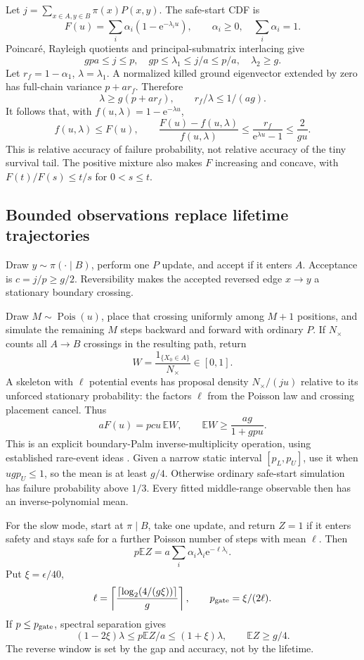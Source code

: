 \documentclass[11pt]{article}
\newcommand{\ee}{\mathrm e}
\begin{document}
Let \(j=\sum_{x\in A,y\in B}\pi(x)P(x,y)\). The safe-start CDF is
\[
 F(u)=\sum_i\alpha_i(1-\ee^{-\lambda_i u}),
 \qquad\alpha_i\ge0,\quad\sum_i\alpha_i=1.
\]
Poincar\'e, Rayleigh quotients and principal-submatrix interlacing give
\[
 gpa\le j\le p,\quad gp\le\lambda_1\le j/a\le p/a,
 \quad\lambda_2\ge g.
\]
Let \(r_f=1-\alpha_1\), \(\lambda=\lambda_1\). A normalized killed ground eigenvector extended by zero has full-chain variance \(p+ar_f\). Therefore
\[
 \lambda\ge g(p+ar_f),\qquad r_f/\lambda\le1/(ag).
\]
It follows that, with \(f(u,\lambda)=1-\ee^{-\lambda u}\),
\begin{equation}
 f(u,\lambda)\le F(u),\qquad
 \frac{F(u)-f(u,\lambda)}{f(u,\lambda)}
 \le\frac{r_f}{\ee^{\lambda u}-1}\le\frac2{gu}.
 \label{eq:tail}
\end{equation}
This is relative accuracy of failure probability, not relative accuracy of the tiny survival tail. The positive mixture also makes \(F\) increasing and concave, with \(F(t)/F(s)\le t/s\) for \(0<s\le t\).

\subsection{Bounded observations replace lifetime trajectories}
Draw \(y\sim\pi(\cdot\mid B)\), perform one \(P\) update, and accept if it enters \(A\). Acceptance is \(c=j/p\ge g/2\). Reversibility makes the accepted reversed edge \(x\to y\) a stationary boundary crossing.

Draw \(M\sim\operatorname{Pois}(u)\), place that crossing uniformly among \(M+1\) positions, and simulate the remaining \(M\) steps backward and forward with ordinary \(P\). If \(N_\times\) counts all \(A\to B\) crossings in the resulting path, return
\[
 W=\frac{1_{\{X_0\in A\}}}{N_\times}\in[0,1].
\]
A skeleton with \(\ell\) potential events has proposal density \(N_\times/(ju)\) relative to its unforced stationary probability: the factors \(\ell\) from the Poisson law and crossing placement cancel. Thus
\[
 aF(u)=pcu\,\mathbb EW,\qquad
 \mathbb EW\ge\frac{ag}{1+gpu}.
\]
This is an explicit boundary-Palm inverse-multiplicity operation, using established rare-event ideas \cite{karpluby}. Given a narrow static interval \([p_L,p_U]\), use it when \(ugp_U\le1\), so the mean is at least \(g/4\). Otherwise ordinary safe-start simulation has failure probability above \(1/3\). Every fitted middle-range observable then has an inverse-polynomial mean.

For the slow mode, start at \(\pi\mid B\), take one update, and return \(Z=1\) if it enters safety and stays safe for a further Poisson number of steps with mean \(\ell\). Then
\[
 p\mathbb EZ=a\sum_i\alpha_i\lambda_i\ee^{-\ell\lambda_i}.
\]
Put \(\xi=\epsilon/40\),
\[
 \ell=\left\lceil\frac{\lceil\log_2(4/(g\xi))\rceil}{g}\right\rceil,
 \qquad p_{\rm gate}=\xi/(2\ell).
\]
If \(p\le p_{\rm gate}\), spectral separation gives
\[
 (1-2\xi)\lambda\le p\mathbb EZ/a\le(1+\xi)\lambda,
 \qquad\mathbb EZ\ge g/4.
\]
The reverse window is set by the gap and accuracy, not by the lifetime.
\end{document}

